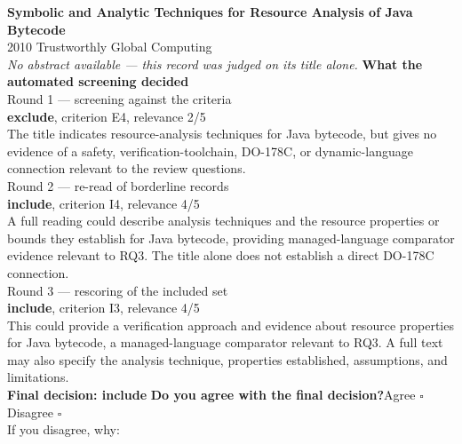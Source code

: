 \documentclass[11pt,a4paper]{article}
\begin{document}
{\large\bfseries Symbolic and Analytic Techniques for Resource Analysis of Java Bytecode}\\[1.5mm]
{\color{soft}\small 2010 \textperiodcentered{} Trustworthly Global Computing}\\[2mm]
{\small\itshape\color{soft}No abstract available --- this record was judged on its title alone.}
\vspace{3mm}
\vspace{2.5mm}
{\small\textbf{What the automated screening decided}}\\[2mm]
{\footnotesize\color{soft}Round 1 --- screening against the criteria}\\[0.5mm]
{\small\textbf{exclude}, criterion E4, relevance 2/5}\\[0.5mm]
{\small The title indicates resource-analysis techniques for Java bytecode, but gives no evidence of a safety, verification-toolchain, DO-178C, or dynamic-language connection relevant to the review questions.}\\[2.5mm]
{\footnotesize\color{soft}Round 2 --- re-read of borderline records}\\[0.5mm]
{\small\textbf{include}, criterion I4, relevance 4/5}\\[0.5mm]
{\small A full reading could describe analysis techniques and the resource properties or bounds they establish for Java bytecode, providing managed-language comparator evidence relevant to RQ3. The title alone does not establish a direct DO-178C connection.}\\[2.5mm]
{\footnotesize\color{soft}Round 3 --- rescoring of the included set}\\[0.5mm]
{\small\textbf{include}, criterion I3, relevance 4/5}\\[0.5mm]
{\small This could provide a verification approach and evidence about resource properties for Java bytecode, a managed-language comparator relevant to RQ3. A full text may also specify the analysis technique, properties established, assumptions, and limitations.}\\[2.5mm]
{\small\textbf{Final decision: include}}
\vspace{2mm}
{\small\textbf{Do you agree with the final decision?}\quad{}Agree $\square$\qquad{}Disagree $\square$}\\[1mm]
{\footnotesize\color{soft}If you disagree, why:}\\[1mm]
\end{document}
